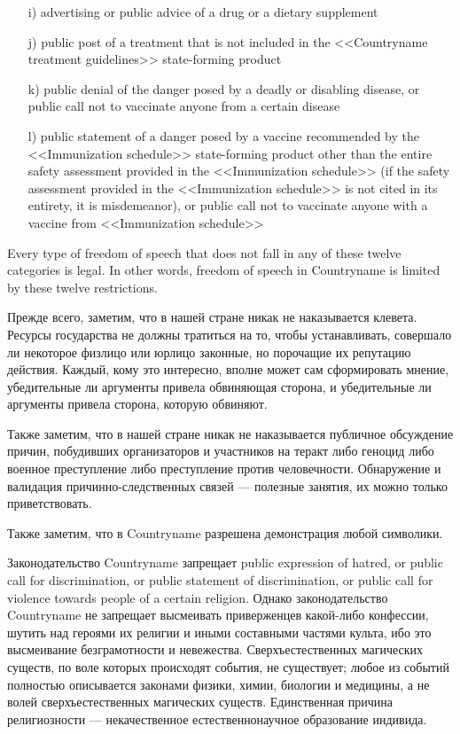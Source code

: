 \documentclass[11pt]{article}
\theoremstyle{remark}
\theoremstyle{definition}
\begin{document}
\begin{itemize}

\item[i)] advertising or public advice of a drug or a dietary supplement 
\item[j)] public post of a treatment that is not included in the <<Countryname treatment guidelines>> state-forming product
\item[k)] public denial of the danger posed by a deadly or disabling disease, or public call not to vaccinate anyone from a certain disease
\item[l)] public statement of a danger posed by a vaccine recommended by the <<Immunization schedule>> state-forming product other than the entire safety assessment provided in the <<Immunization schedule>> (if the safety assessment provided in the <<Immunization schedule>> is not cited in its entirety, it is misdemeanor), or public call not to vaccinate anyone with a vaccine from <<Immunization schedule>>



\end{itemize}


Every type of freedom of speech that does not fall in any of these twelve categories is legal. In other words, freedom of speech in Countryname is limited by these twelve restrictions.



\color{blue}


Прежде всего, заметим, что в нашей стране никак не наказывается клевета. Ресурсы государства не должны тратиться на то, чтобы устанавливать, совершало ли некоторое физлицо или юрлицо законные, но порочащие их репутацию действия. Каждый, кому это интересно, вполне может сам сформировать мнение, убедительные ли аргументы привела обвиняющая сторона, и убедительные ли аргументы привела сторона, которую обвиняют. 

Также заметим, что в нашей стране никак не наказывается публичное обсуждение причин, побудивших организаторов и участников на теракт либо геноцид либо военное преступление либо преступление против человечности. Обнаружение и валидация причинно-следственных связей --- полезные занятия, их можно только приветствовать.

Также заметим, что в Countryname разрешена демонстрация любой символики.


Законодательство Countryname запрещает public expression of hatred, or public call for discrimination, or public statement of discrimination, or public call for violence towards people of a certain religion. Однако законодательство Countryname не запрещает высмеивать приверженцев какой-либо конфессии, шутить над героями их религии и иными составными частями культа, ибо это высмеивание безграмотности и невежества. Сверхъестественных магических существ, по воле которых происходят события, не существует; любое из событий полностью описывается законами физики, химии, биологии и медицины, а не волей сверхъестественных магических существ. Единственная причина религиозности --- некачественное естественнонаучное образование индивида.
\end{document}
